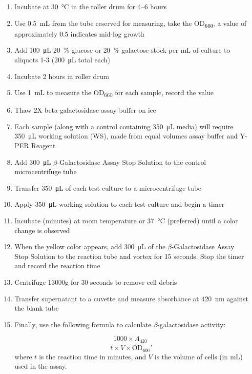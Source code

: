\begin{enumerate}
\item Incubate at \qty{30}{\degreeCelsius} in the roller drum for \numrange{4}{6} hours
\item Use \qty{0.5}{\milli\liter} from the tube reserved for measuring, take the OD\textsubscript{\num{660}}, a value of approximately \num{0.5} indicates mid-log growth
\item Add \qty{100}{\micro\liter} \qty{20}{\percent} glucose or \qty{20}{\percent} galactose stock per \unit{\milli\liter} of culture to aliquots 1-3 (\qty{200}{\micro\liter} total each)
\item Incubate \num{2} hours in roller drum
\item Use \qty{1}{\milli\liter} to measure the OD\textsubscript{\num{660}} for each sample, record the value
\item Thaw \num{2}X beta-galactosidase assay buffer on ice
\item Each sample (along with a control containing \qty{350}{\micro\liter} media) will require \qty{350}{\micro\liter} working solution (WS), made from equal volumes assay buffer and Y-PER Reagent
\item Add \qty{300}{\micro\liter} \(\beta\)-Galactosidase Assay Stop Solution to the control microcentrifuge tube
\item Transfer \qty{350}{\micro\liter} of each test culture to a microcentrifuge tube
\item Apply \qty{350}{\micro\liter} working solution to each test culture and begin a timer
\item Incubate (minutes) at room temperature or \qty{37}{\degreeCelsius} (preferred) until a color change is observed
\item When the yellow color appears, add \qty{300}{\micro\liter} of the \(\beta\)-Galactosidase Assay Stop Solution to the reaction tube and vortex for \num{15} seconds. Stop the timer and record the reaction time
\item Centrifuge \num{13000}g for \num{30} seconds to remove cell debris
\item Transfer supernatant to a cuvette and measure absorbance at \qty{420}{\nano\meter} against the blank tube

\item Finally, use the following formula to calculate \(\beta\)-galactosidase activity:

\[\frac{1000 \times A_{420}}{t\times V \times\text{OD}_{600}},\] where \(t\) is the reaction time in minutes, and \(V\) is the volume of cells (in \unit{\milli\liter}) used in the assay.

\end{enumerate}